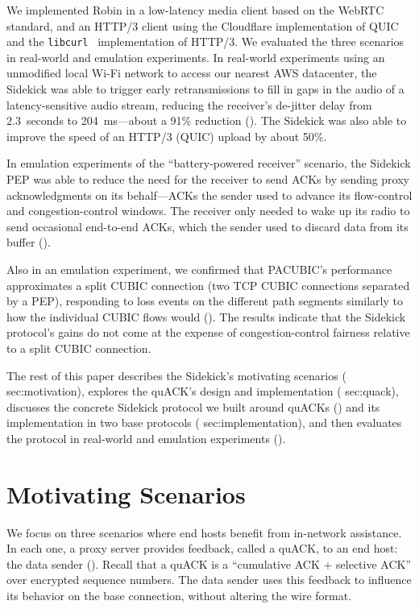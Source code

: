 We implemented Robin in a low-latency media client
based on the WebRTC standard, and an HTTP/3 client using the Cloudflare
implementation of QUIC~\cite{quiche} and the \texttt{libcurl}~\cite{libcurl}
implementation of HTTP/3. We evaluated the three scenarios in
real-world and emulation experiments.
In real-world experiments using an unmodified local Wi-Fi network to access our
nearest AWS datacenter, the Sidekick was able to trigger early retransmissions
to fill in gaps in the audio of a latency-sensitive audio stream, reducing the
receiver's de-jitter delay from 2.3~seconds to 204~ms---about a 91\% reduction
(). The Sidekick was also able to improve the speed of an
HTTP/3 (QUIC) upload by about 50\%.

In emulation experiments of the ``battery-powered receiver'' scenario,
the Sidekick PEP was able to reduce the need for the receiver to send ACKs
by sending proxy acknowledgments on its behalf---ACKs the sender used
to advance its flow-control and congestion-control windows. The
receiver only needed to wake up its radio to send occasional
end-to-end ACKs, which the sender used to discard data from its
buffer ().

Also in an emulation experiment, we confirmed that PACUBIC's
performance approximates a split CUBIC connection (two TCP CUBIC
connections separated by a PEP), responding to loss events on the
different path segments similarly to how the individual CUBIC flows would
(). The results indicate that the Sidekick protocol's gains
do not come at the
expense of congestion-control fairness relative to a split CUBIC connection.

\smallskip

The rest of this paper describes the Sidekick's motivating scenarios (\Cref
{sec:motivation}), explores the quACK's design and implementation (\Cref
{sec:quack}), discusses the concrete Sidekick protocol we built around quACKs
() and its implementation in two base protocols (\Cref
{sec:implementation}), and then evaluates the protocol in real-world and
emulation experiments ().

\section{Motivating Scenarios}



We focus on three scenarios where end hosts benefit from in-network assistance.
In each one, a proxy server provides feedback, called a quACK, to an end host:
the data sender (). Recall that a quACK is a
``cumulative ACK + selective ACK'' over encrypted sequence numbers. The data
sender uses this feedback to influence its behavior on the base connection,
without altering the wire format.

